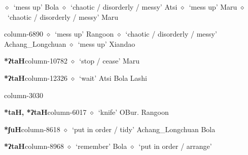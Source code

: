          $\diamond$~`mess up'
         Bola 
\hspace{1ex}
         $\diamond$~`chaotic / disorderly / messy'
         Atsi 
\hspace{1ex}
         $\diamond$~`mess up'
         Maru 
\hspace{1ex}
         $\diamond$~`chaotic / disorderly / messy'
         Maru 
  \item {\footnotesize \textbf{}}{\tiny column-6890}
         $\diamond$~`mess up'
         Rangoon 
\hspace{1ex}
         $\diamond$~`chaotic / disorderly / messy'
         Achang\_Longchuan 
\hspace{1ex}
         $\diamond$~`mess up'
         Xiandao 
  \item {\footnotesize \textbf{*ʔtaH}}{\tiny column-10782}
         $\diamond$~`stop / cease'
         Maru 
  \item {\footnotesize \textbf{*ʔtaH}}{\tiny column-12326}
         $\diamond$~`wait'
         Atsi 
\hspace{1ex}
         Bola 
\hspace{1ex}
         Lashi 
  \item {\footnotesize \textbf{}}{\tiny column-3030}
  \item {\footnotesize \textbf{*taH, *ʔtaH}}{\tiny column-6017}
         $\diamond$~`knife'
         OBur. 
\hspace{1ex}
         Rangoon 
  \item {\footnotesize \textbf{*ʃuH}}{\tiny column-8618}
         $\diamond$~`put in order / tidy'
         Achang\_Longchuan 
\hspace{1ex}
         Bola 
  \item {\footnotesize \textbf{*ʔtaH}}{\tiny column-8968}
         $\diamond$~`remember'
         Bola 
\hspace{1ex}
         $\diamond$~`put in order / arrange'
